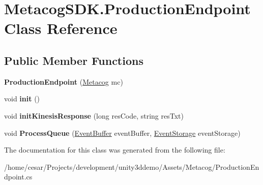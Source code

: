 \hypertarget{classMetacogSDK_1_1ProductionEndpoint}{}\section{Metacog\+S\+D\+K.\+Production\+Endpoint Class Reference}
\label{classMetacogSDK_1_1ProductionEndpoint}
\subsection*{Public Member Functions}
\begin{DoxyCompactItemize}
\item 
{\bfseries Production\+Endpoint} (\hyperlink{classMetacogSDK_1_1Metacog}{Metacog} mc)\hypertarget{classMetacogSDK_1_1ProductionEndpoint_a4f2c7ba7c615ee5f4985662f93aef13d}{}\label{classMetacogSDK_1_1ProductionEndpoint_a4f2c7ba7c615ee5f4985662f93aef13d}

\item 
void {\bfseries init} ()\hypertarget{classMetacogSDK_1_1ProductionEndpoint_ab2876d8ae2c940c683a02b6828506cd8}{}\label{classMetacogSDK_1_1ProductionEndpoint_ab2876d8ae2c940c683a02b6828506cd8}

\item 
void {\bfseries init\+Kinesis\+Response} (long res\+Code, string res\+Txt)\hypertarget{classMetacogSDK_1_1ProductionEndpoint_a42e917f279f0c16fde8f8976c78cdc40}{}\label{classMetacogSDK_1_1ProductionEndpoint_a42e917f279f0c16fde8f8976c78cdc40}

\item 
void {\bfseries Process\+Queue} (\hyperlink{classMetacogSDK_1_1EventBuffer}{Event\+Buffer} event\+Buffer, \hyperlink{classMetacogSDK_1_1EventStorage}{Event\+Storage} event\+Storage)\hypertarget{classMetacogSDK_1_1ProductionEndpoint_a26431797fe15fcba641d047440fef2f9}{}\label{classMetacogSDK_1_1ProductionEndpoint_a26431797fe15fcba641d047440fef2f9}

\end{DoxyCompactItemize}


The documentation for this class was generated from the following file\+:\begin{DoxyCompactItemize}
\item 
/home/cesar/\+Projects/development/unity3ddemo/\+Assets/\+Metacog/Production\+Endpoint.\+cs\end{DoxyCompactItemize}
